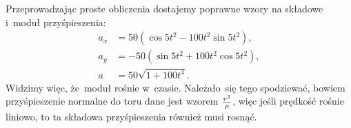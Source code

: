\documentclass[a4paper,11pt]{article}
\begin{document}
Przeprowadzając proste obliczenia dostajemy poprawne wzory na składowe
i~moduł przyśpieszenia:
\begin{align*}
  a_{ x } &= 50 ( \cos 5t^{ 2 } - 100 t^{ 2 } \sin 5t^{ 2 } ), \\
  a_{ y } &= -50 ( \sin 5t^{ 2 } + 100 t^{ 2 } \cos 5t^{ 2 } ), \\
  a &= 50 \sqrt{ 1 + 100 t^{ 4 } }.
\end{align*}
Widzimy więc, że~moduł rośnie w~czasie. Należało~się tego spodziewać,
bowiem przyśpieszenie normalne do toru dane jest wzorem
$\frac{ v^{ 2 } }{ \rho }$, więc jeśli prędkość rośnie liniowo, to ta
składowa przyśpieszenia również musi rosnąć.

\end{document}
